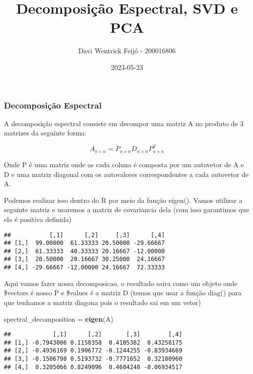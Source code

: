 \documentclass[
]{article}
\title{Decomposição Espectral, SVD e PCA}
\author{Davi Wentrick Feijó - 200016806}
\date{2023-05-23}
\newenvironment{Shaded}{\begin{snugshade}}{\end{snugshade}}
\newcommand{\FunctionTok}[1]{\textcolor[rgb]{0.13,0.29,0.53}{\textbf{#1}}}
\newcommand{\NormalTok}[1]{#1}
\newcommand{\OtherTok}[1]{\textcolor[rgb]{0.56,0.35,0.01}{#1}}
\newcommand{\SpecialCharTok}[1]{\textcolor[rgb]{0.81,0.36,0.00}{\textbf{#1}}}
\begin{document}
\maketitle

\hypertarget{decomposiuxe7uxe3o-espectral}{%
\subsubsection{Decomposição
Espectral}\label{decomposiuxe7uxe3o-espectral}}

A decomposição espectral consiste em decompor uma matriz A no produto de
3 matrizes da seguinte forma:

\[
A_{n \times n} = P_{n \times n} D_{n \times n} P_{n \times n}^{T}
\]

Onde P é uma matriz onde as cada coluna é composta por um autovetor de A
e D e uma matriz diagonal com os autovalores correspondentes a cada
autovetor de A.

Podemos realizar isso dentro do R por meio da função eigen(). Vamos
utilizar a seguinte matriz e usaremos a matriz de covariancia dela (com
isso garantimos que ela é positiva definida)

\begin{verbatim}
##           [,1]      [,2]     [,3]      [,4]
## [1,]  99.00000  61.33333 20.50000 -29.66667
## [2,]  61.33333  40.33333 20.16667 -12.00000
## [3,]  20.50000  20.16667 30.25000  24.16667
## [4,] -29.66667 -12.00000 24.16667  72.33333
\end{verbatim}

Aqui vamos fazer nossa decomposicao, o resultado saira como um objeto
onde \$vectors é nosso P e \$values é a matriz D (temos que usar a
função diag() para que tenhamos a matriz diagona pois o resultado sai em
um vetor)

\begin{Shaded}
\begin{Highlighting}[]
\NormalTok{spectral\_decomposition }\OtherTok{=} \FunctionTok{eigen}\NormalTok{(A)}
\end{Highlighting}
\end{Shaded}

\begin{Shaded}
\end{Shaded}

\begin{verbatim}
##            [,1]      [,2]       [,3]        [,4]
## [1,] -0.7943006 0.1158358  0.4105382  0.43258175
## [2,] -0.4936169 0.1906772 -0.1244255 -0.83934669
## [3,] -0.1506798 0.5193732 -0.7771652  0.32180960
## [4,]  0.3205066 0.8249096  0.4604248 -0.06934517
\end{verbatim}
\end{document}
